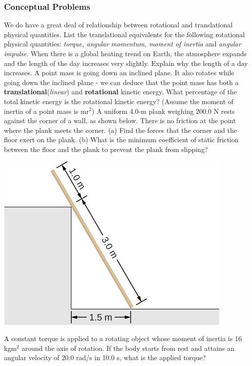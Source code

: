 \documentclass[9pt,addpoints]{exam}
\begin{document}
	\begin{questions}
			\subsubsection*{Conceptual Problems}
		\question We do have a great deal of relationship between rotational and translational physical quantities. List the translational equivalents for the following rotational physical quantities: \textit{torque, angular momentum, moment of inertia} and \textit{angular impulse}.
		\question When there is a global heating trend on Earth, the atmosphere expands and the length of the day increases very slightly. Explain why the length of a day increases.
		\question A point mass is going down an inclined plane. It also rotates while going down the inclined plane - we can deduce that the point mass has both a \textbf{translational}(\textit{linear}) and \textbf{rotational} kinetic energy. What percentage of the total kinetic energy is the rotational kinetic energy? (Assume the moment of inertia of a point mass is $\text{mr}^2$)
		\question A uniform 4.0-m plank weighing 200.0 N rests against the corner of a wall, as shown below. There is no friction at the point where the plank meets the corner. (a) Find the forces that the corner and the floor exert on the plank. (b) What is the minimum coefficient of static friction between the floor and the plank to prevent the plank from slipping?
		\begin{center}
					\includegraphics[scale=0.8]{ladder.jpeg}
		\end{center}
		\question A constant torque is applied to a rotating object whose moment of inertia is  16 kgm$^2$ around the axis of rotation. If the body starts from rest and attains an angular velocity of 20.0 rad/s in 10.0 s, what is the applied torque?

\end{questions}
\end{document}
